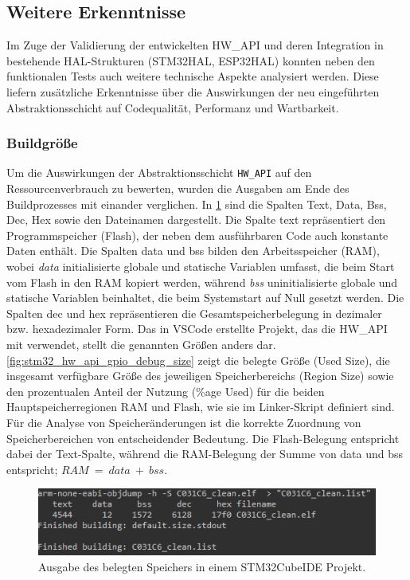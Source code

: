 \subsection{Weitere Erkenntnisse}
Im Zuge der Validierung der entwickelten HW\_API und deren Integration in bestehende HAL-Strukturen (STM32HAL, ESP32HAL) konnten neben den funktionalen Tests auch weitere technische Aspekte analysiert werden. 
Diese liefern zusätzliche Erkenntnisse über die Auswirkungen der neu eingeführten Abstraktionsschicht auf Codequalität, Performanz und Wartbarkeit.

\subsubsection{Buildgröße}
Um die Auswirkungen der Abstraktionsschicht \texttt{HW\_API} auf den Ressourcenverbrauch zu bewerten, wurden die Ausgaben am Ende des Buildprozesses mit einander verglichen.
In \cref{fig:stm32_cube_gpio_debug_size} sind die Spalten Text, Data, Bss, Dec, Hex sowie den Dateinamen dargestellt.
Die Spalte text repräsentiert den Programmspeicher (Flash), der neben dem  ausführbaren Code auch konstante Daten enthält. 
Die Spalten data und bss bilden den Arbeitsspeicher (RAM), wobei \textit{data} initialisierte globale und statische Variablen umfasst, die beim Start vom Flash in den RAM kopiert werden, während \textit{bss} uninitialisierte globale und statische Variablen beinhaltet, die beim Systemstart auf Null gesetzt werden. 
Die Spalten dec und hex repräsentieren die Gesamtspeicherbelegung in dezimaler bzw. hexadezimaler Form.
Das in VSCode erstellte Projekt, das die HW\_API mit verwendet, stellt die genannten Größen anders dar.
\cref{fig:stm32_hw_api_gpio_debug_size} zeigt die belegte Größe (Used Size), die insgesamt verfügbare Größe des jeweiligen Speicherbereichs (Region Size) sowie den prozentualen Anteil der Nutzung (\%age Used) für die beiden Hauptspeicherregionen RAM und Flash, wie sie im Linker-Skript definiert sind.
Für die Analyse von Speicheränderungen ist die korrekte Zuordnung von Speicherbereichen von entscheidender Bedeutung. 
Die Flash-Belegung entspricht dabei der Text-Spalte, während die RAM-Belegung der Summe von data und bss entspricht; $RAM\ =\ data\ +\ bss$.


\begin{figure}[H]
	\includegraphics[width=\textwidth]{Pics/stm32c031c6_gpio_debug_size.png}
	\caption{Ausgabe des belegten Speichers in einem STM32CubeIDE Projekt.}
	\label{fig:stm32_cube_gpio_debug_size}
\end{figure}

